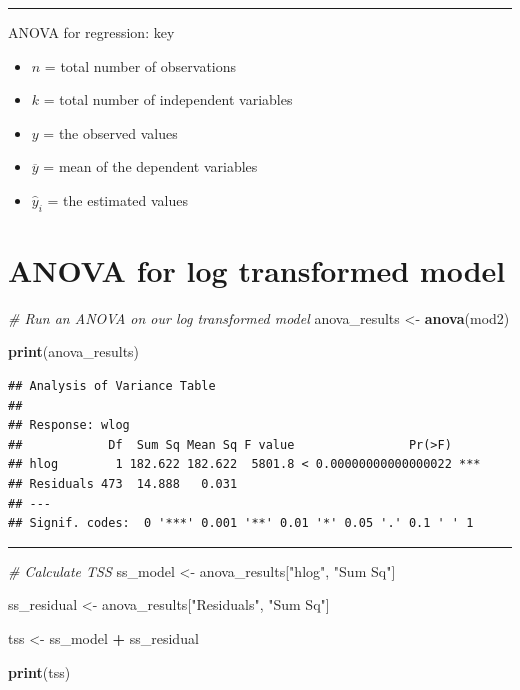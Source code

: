 \documentclass[
]{article}
\newenvironment{Shaded}{\begin{snugshade}}{\end{snugshade}}
\newcommand{\CommentTok}[1]{\textcolor[rgb]{0.56,0.35,0.01}{\textit{#1}}}
\newcommand{\FunctionTok}[1]{\textcolor[rgb]{0.13,0.29,0.53}{\textbf{#1}}}
\newcommand{\NormalTok}[1]{#1}
\newcommand{\OtherTok}[1]{\textcolor[rgb]{0.56,0.35,0.01}{#1}}
\newcommand{\SpecialCharTok}[1]{\textcolor[rgb]{0.81,0.36,0.00}{\textbf{#1}}}
\newcommand{\StringTok}[1]{\textcolor[rgb]{0.31,0.60,0.02}{#1}}
\providecommand{\tightlist}{%
  \setlength{\itemsep}{0pt}\setlength{\parskip}{0pt}}
\begin{document}
\begin{center}\rule{0.5\linewidth}{0.5pt}\end{center}

ANOVA for regression: key

\begin{itemize}
\tightlist
\item
  \(n\) = total number of observations
\item
  \(k\) = total number of independent variables
\item
  \(y\) = the observed values
\item
  \(\overline{y}\) = mean of the dependent variables
\item
  \(\hat{y}_{i}\) = the estimated values
\end{itemize}

\hypertarget{anova-for-log-transformed-model}{%
\section{ANOVA for log transformed
model}\label{anova-for-log-transformed-model}}

\begin{Shaded}
\begin{Highlighting}[]
\CommentTok{\# Run an ANOVA on our log transformed model}
\NormalTok{anova\_results }\OtherTok{\textless{}{-}}
  \FunctionTok{anova}\NormalTok{(mod2)}

\FunctionTok{print}\NormalTok{(anova\_results)}
\end{Highlighting}
\end{Shaded}

\begin{verbatim}
## Analysis of Variance Table
## 
## Response: wlog
##            Df  Sum Sq Mean Sq F value                Pr(>F)    
## hlog        1 182.622 182.622  5801.8 < 0.00000000000000022 ***
## Residuals 473  14.888   0.031                                  
## ---
## Signif. codes:  0 '***' 0.001 '**' 0.01 '*' 0.05 '.' 0.1 ' ' 1
\end{verbatim}

\begin{center}\rule{0.5\linewidth}{0.5pt}\end{center}

\begin{Shaded}
\begin{Highlighting}[]
\CommentTok{\# Calculate TSS}
\NormalTok{ss\_model }\OtherTok{\textless{}{-}}
\NormalTok{  anova\_results[}\StringTok{"hlog"}\NormalTok{, }\StringTok{"Sum Sq"}\NormalTok{]}

\NormalTok{ss\_residual }\OtherTok{\textless{}{-}}
\NormalTok{  anova\_results[}\StringTok{"Residuals"}\NormalTok{, }\StringTok{"Sum Sq"}\NormalTok{]}

\NormalTok{tss }\OtherTok{\textless{}{-}} 
\NormalTok{  ss\_model }\SpecialCharTok{+}\NormalTok{ ss\_residual}

\FunctionTok{print}\NormalTok{(tss)}
\end{Highlighting}
\end{Shaded}
\end{document}
